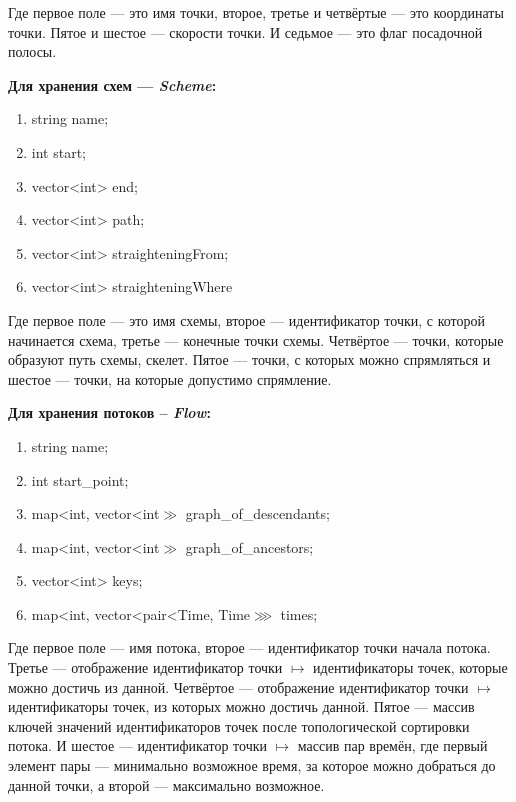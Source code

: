 \documentclass[12pt, a4 paper]{article}
\theoremstyle{plain}
\begin{document}
Где первое поле --- это имя точки, второе, третье и четвёртые --- это координаты точки. Пятое и шестое --- скорости точки. И седьмое --- это флаг посадочной полосы.


\textbf{Для хранения схем --- \textit{Scheme}:}

\begin{enumerate}
	\item string name;
	\item int start;
	\item vector<int> end;
	\item vector<int> path;
	\item vector<int> straighteningFrom;
	\item vector<int> straighteningWhere
\end{enumerate}

Где первое поле --- это имя схемы, второе --- идентификатор точки, с которой начинается схема, третье --- конечные точки схемы. Четвёртое --- точки, которые образуют путь схемы, скелет. Пятое --- точки, с которых можно спрямляться и шестое --- точки, на которые допустимо спрямление.


\textbf{Для хранения потоков – \textit{Flow}:}

\begin{enumerate}
	\item string name;
	\item int start\_point;
	\item map<int, vector<int$\gg$ graph\_of\_descendants;
	\item map<int, vector<int$\gg$ graph\_of\_ancestors;
	\item vector<int> keys;
	\item map<int, vector<pair<Time, Time$\ggg$ times;
\end{enumerate}

Где первое поле --- имя потока, второе --- идентификатор точки начала потока. Третье --- отображение идентификатор точки $\mapsto$ идентификаторы точек, которые можно достичь из данной. Четвёртое --- отображение идентификатор точки $\mapsto$ идентификаторы точек, из которых можно достичь данной. Пятое --- массив ключей значений идентификаторов точек после топологической сортировки потока. И шестое --- идентификатор точки $\mapsto$ массив пар времён, где первый элемент пары --- минимально возможное время, за которое можно добраться до данной точки, а второй --- максимально возможное.
\end{document}
